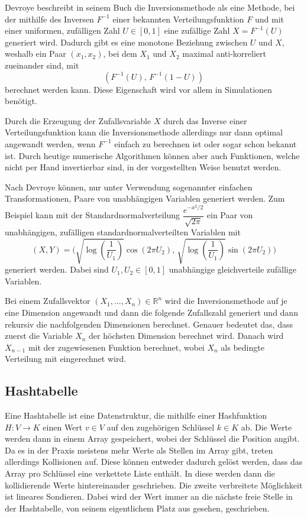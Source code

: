 Devroye \cite{devroye-non_uniform_random_variate-1986} beschreibt in seinem Buch die Inversionsmethode als eine 
Methode, bei der mithilfe des Inversen $F^{-1}$ einer bekannten Verteilungsfunktion $F$ und mit einer uniformen, 
zufälligen Zahl $U \in [0, 1]$ eine zufällige Zahl $X = F^{-1}(U)$ generiert wird. Dadurch gibt es eine monotone 
Beziehung zwischen $U$ und $X$, weshalb ein Paar $(x_1, x_2)$, bei dem $X_1$ und $X_2$ maximal anti-korreliert 
zueinander sind, mit 
\begin{equation}
    (F^{-1}(U),\, F^{-1}(1 - U))
\end{equation}
berechnet werden kann. Diese Eigenschaft wird vor allem in 
Simulationen benötigt.

Durch die Erzeugung der Zufallsvariable $X$ durch das Inverse einer Verteilungsfunktion kann die Inversionsmethode 
allerdings nur dann optimal angewandt werden, wenn $F^{-1}$ einfach zu berechnen ist oder sogar schon bekannt ist. 
Durch heutige numerische Algorithmen können aber auch Funktionen, welche nicht \glqq per Hand\grqq{} invertierbar sind, in der 
vorgestellten Weise benutzt werden. 

Nach Devroye können, nur unter Verwendung sogenannter \glqq einfachen Transformationen\grqq, Paare von unabhängigen 
Variablen generiert werden. Zum Beispiel kann mit der Standardnormalverteilung $\dfrac{e^{-x^2/2}}{\sqrt{2\pi}}$ ein Paar von 
unabhängigen, zufälligen standardnormalverteilten Variablen mit 
\begin{equation}
    (X, Y) = \bigg( \sqrt{\log(\dfrac{1}{U_1})}\cos(2\pi U_2),\, \sqrt{\log(\dfrac{1}{U_1})}\sin(2\pi U_2) \bigg)
    \label{eq:stdnormdensity}
\end{equation}
generiert werden. Dabei sind $U_1, U_2 \in [0, 1]$ unabhängige gleichverteile zufällige Variablen.

Bei einem Zufallsvektor $ (X_1, ..., X_n) \in \mathbb{R}^n$ wird die Inversionsmethode auf je eine Dimension angewandt 
und dann die folgende Zufallszahl generiert und dann rekursiv die nachfolgenden Dimensionen berechnet. Genauer bedeutet das, 
dass zuerst die Variable $X_n$ der höchsten Dimension berechnet wird. Danach wird $X_{n-1}$ mit der zugewiesenen Funktion 
berechnet, wobei $X_n$ als bedingte Verteilung mit eingerechnet wird.


\subsection{Hashtabelle}
Eine Hashtabelle ist eine Datenstruktur, die mithilfe einer Hashfunktion $H: V \rightarrow K$ einen Wert $v \in V$ 
auf den zugehörigen Schlüssel $k \in K$ ab. Die Werte werden dann in einem Array gespeichert, 
wobei der Schlüssel die Position angibt. Da es in der Praxis meistens mehr Werte als Stellen im Array gibt, treten 
allerdings Kollisionen auf. Diese können entweder dadurch gelöst werden, dass das Array pro Schlüssel eine verkettete 
Liste enthält. In diese werden dann die kollidierende Werte hintereinander geschrieben. Die zweite verbreitete Möglichkeit 
ist lineares Sondieren. Dabei wird der Wert immer an die nächste freie Stelle in der Hashtabelle, von seinem eigentlichem 
Platz aus gesehen, geschrieben.


